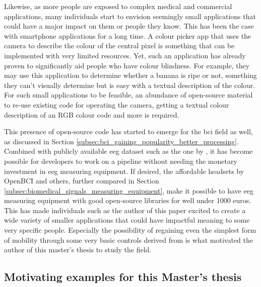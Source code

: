 Likewise, as more people are exposed to complex medical and commercial applications, many individuals start to envision seemingly small applications that could have a major impact on them or people they know.
This has been the case with smartphone applications for a long time.
A colour picker app that uses the camera to describe the colour of the central pixel is something that can be implemented with very limited resources.
Yet, such an application has already proven to significantly aid people who have colour blindness.
For example, they may use this application to determine whether a banana is ripe or not, something they can't visually determine but is easy with a textual description of the colour.
For such small applications to be feasible, an abundance of open-source material to re-use existing code for operating the camera, getting a textual colour description of an RGB colour code and more is required.

This presence of open-source code has started to emerge for the \gls{bci} field as well, as discussed in Section \ref{subsec:bci_gaining_popularity_better_processing}.
Combined with publicly available \gls{eeg} dataset such as the one by \citet{eeg_data}, it has become possible for developers to work on a pipeline without needing the monetary investment in \gls{eeg} measuring equipment.
If desired, the affordable headsets by OpenBCI and others, further compared in Section \ref{subsec:biomedical_signals_measuring_equipment}, make it possible to have \gls{eeg} measuring equipment with good open-source libraries for well under 1000 euros.
This has made individuals such as the author of this paper excited to create a wide variety of smaller applications that could have impactful meaning to some very specific people.
Especially the possibility of regaining even the simplest form of mobility through some very basic controls derived from  is what motivated the author of this master's thesis to study the field.



\subsection{Motivating examples for this Master's thesis}
\label{subsec:bci_opportunities_obstacles_motivating_examples}


